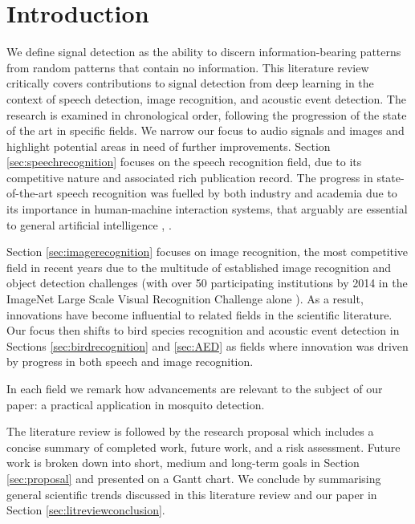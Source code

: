 \documentclass[12pt]{llncs}
\newcommand{\ikn}[1]{\todo[size = \small, color=orange!30]{[ik] #1}}
\begin{document}
\section{Introduction}
We define signal detection as the ability to discern information-bearing patterns from random patterns that contain no information. 
This literature review critically covers contributions to signal detection from deep learning in the context of speech detection, image recognition, and acoustic event detection. The research is examined in chronological order, following the progression of the state of the art in specific fields. We narrow our focus to audio signals and images and highlight potential areas in need of further improvements\ikn{Need to do this}. Section \ref{sec:speechrecognition} focuses on the speech recognition field, due to its competitive nature and associated rich publication record. The progress in state-of-the-art speech recognition was fuelled by both industry and academia due to its importance in human-machine interaction systems, that arguably are essential to general artificial intelligence \cite{rabiner1993fundamentals}, \cite{juang2005automatic}.

Section \ref{sec:imagerecognition} focuses on image recognition, the most competitive field in recent years due to the multitude of established image recognition and object detection challenges (with over 50 participating institutions by 2014 in the ImageNet Large Scale Visual Recognition Challenge alone \cite{russakovsky2014imagenet}). As a result, innovations have become influential to related fields in the scientific literature.
Our focus then shifts to bird species recognition and acoustic event detection in Sections \ref{sec:birdrecognition} and \ref{sec:AED} as fields where innovation was driven by progress in both speech and image recognition.

In each field we remark how advancements are relevant to the subject of our paper: a practical application in mosquito detection.

The literature review is followed by the research proposal which includes a concise summary of completed work, future work, and a risk assessment. Future work is broken down into short, medium and long-term goals in Section \ref{sec:proposal} and presented on a Gantt chart. We conclude by summarising general scientific trends discussed in this literature review and our paper in Section \ref{sec:litreviewconclusion}.
\end{document}
